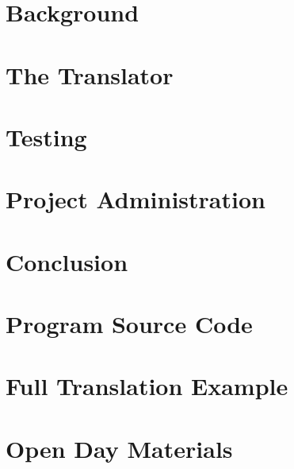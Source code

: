 \documentclass[a4paper,12pt,twoside,openright]{report}
\begin{document}
%
%



\tableofcontents


%
%

\chapter{Background}


\chapter{The Translator}


\chapter{Testing}


\chapter{Project Administration}


\chapter{Conclusion}



%
%

\appendix

\chapter{Program Source Code}


\chapter{Full Translation Example}


\chapter{Open Day Materials}



%
%


\end{document}
